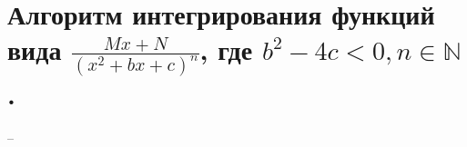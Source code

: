 \section{Алгоритм интегрирования функций вида $\frac{Mx + N}{(x^2 + bx + c)^n}$, где $b^2 - 4c < 0, n \in \mathbb{N}$.}
--
\newline